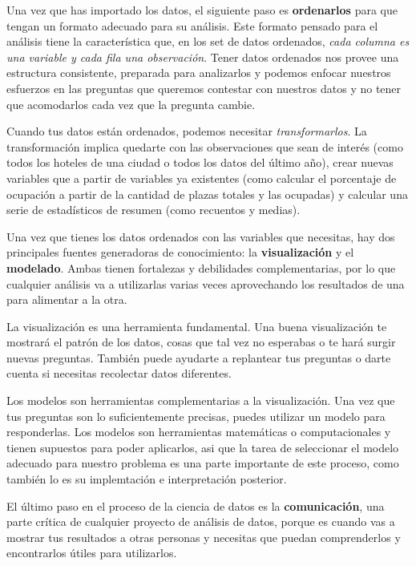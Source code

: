 \documentclass[
  openany]{book}
\begin{document}
Una vez que has importado los datos, el siguiente paso es \textbf{ordenarlos} para que tengan un formato adecuado para su análisis.
Este formato pensado para el análisis tiene la característica que, en los set de datos ordenados, \emph{cada columna es una variable y cada fila una observación}.
Tener datos ordenados nos provee una estructura consistente, preparada para analizarlos y podemos enfocar nuestros esfuerzos en las preguntas que queremos contestar con nuestros datos y no tener que acomodarlos cada vez que la pregunta cambie.

Cuando tus datos están ordenados, podemos necesitar \emph{transformarlos}.
La transformación implica quedarte con las observaciones que sean de interés (como todos los hoteles de una ciudad o todos los datos del último año), crear nuevas variables que a partir de variables ya existentes (como calcular el porcentaje de ocupación a partir de la cantidad de plazas totales y las ocupadas) y calcular una serie de estadísticos de resumen (como recuentos y medias).

Una vez que tienes los datos ordenados con las variables que necesitas, hay dos principales fuentes generadoras de conocimiento: la \textbf{visualización} y el \textbf{modelado}.
Ambas tienen fortalezas y debilidades complementarias, por lo que cualquier análisis va a utilizarlas varias veces aprovechando los resultados de una para alimentar a la otra.

La visualización es una herramienta fundamental.
Una buena visualización te mostrará el patrón de los datos, cosas que tal vez no esperabas o te hará surgir nuevas preguntas.
También puede ayudarte a replantear tus preguntas o darte cuenta si necesitas recolectar datos diferentes.

Los modelos son herramientas complementarias a la visualización.
Una vez que tus preguntas son lo suficientemente precisas, puedes utilizar un modelo para responderlas.
Los modelos son herramientas matemáticas o computacionales y tienen supuestos para poder aplicarlos, asi que la tarea de seleccionar el modelo adecuado para nuestro problema es una parte importante de este proceso, como también lo es su implemtación e interpretación posterior.

El último paso en el proceso de la ciencia de datos es la \textbf{comunicación}, una parte crítica de cualquier proyecto de análisis de datos, porque es cuando vas a mostrar tus resultados a otras personas y necesitas que puedan comprenderlos y encontrarlos útiles para utilizarlos.
\end{document}
